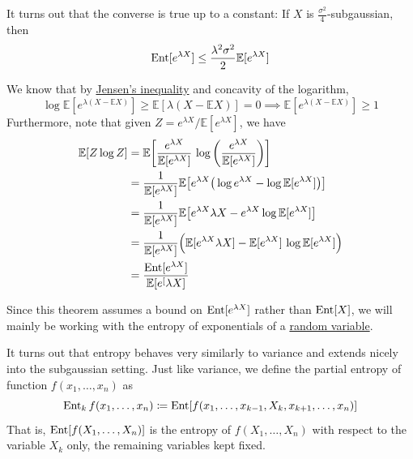   \begin{exercise}
  It turns out that the converse is true up to a constant: If $X$ is $\frac{\sigma^2}{4}$-subgaussian, then 
  \begin{equation}
    \operatorname{Ent} [e^{\lambda X}] \leq \frac{\lambda^2 \sigma^2}{2} \mathbb{E}[e^{\lambda X}]
  \end{equation}
  \end{exercise}
  \begin{solution}
  We know that by \hyperref[thm:jensens-inequality]{Jensen's inequality} and concavity of the logarithm, 
  \begin{equation}
    \log \mathbb{E}[e^{\lambda(X - \mathbb{E} X)}] \geq \mathbb{E}[\lambda (X - \mathbb{E} X)] = 0 \implies \mathbb{E}[e^{\lambda(X - \mathbb{E} X)}] \geq 1
  \end{equation}
  Furthermore, note that given $Z = e^{\lambda X} / \mathbb{E}[e^{\lambda X}]$, we have 
  \begin{align*}
      \mathbb{E}[Z \log{Z}] & = \mathbb{E} \bigg[ \frac{e^{\lambda X}}{\mathbb{E}[e^{\lambda X}]} \, \log \bigg( \frac{e^{\lambda X}}{\mathbb{E}[e^{\lambda X}]} \bigg) \bigg] \\
      & = \frac{1}{\mathbb{E}[e^{\lambda X}]} \mathbb{E}\big[ e^{\lambda X} \big( \log e^{\lambda X} - \log \mathbb{E}[e^{\lambda X}] \big) \big] \\
      & = \frac{1}{\mathbb{E}[e^{\lambda X}]} \mathbb{E} \big[ e^{\lambda X} \lambda X - e^{\lambda X} \log \mathbb{E}[e^{\lambda X}] \big] \\
      & = \frac{1}{\mathbb{E}[e^{\lambda X}]} \Big( \mathbb{E} [ e^{\lambda X} \lambda X ] - \mathbb{E}[ e^{\lambda X}] \, \log \mathbb{E}[e^{\lambda X}] \Big) \\
      & = \frac{\operatorname{Ent} [e^{\lambda X}]}{\mathbb{E}[e^[{\lambda X}]} 
  \end{align*}

  \end{solution}

  Since this theorem assumes a bound on $\operatorname{Ent}[e^{\lambda X}]$ rather than $\operatorname{Ent}[X]$, we will mainly be working with the entropy of exponentials of a \hyperref[prob-def:random-variable]{random variable}. 

  It turns out that entropy behaves very similarly to variance and extends nicely into the subgaussian setting. Just like variance, we define the partial entropy of function $f(x_1, \ldots, x_n)$ as 
  \begin{equation}
    \operatorname{Ent}_k f (x_1, \ldots, x_n) \coloneqq \operatorname{Ent}[ f(x_1, \ldots, x_{k-1}, X_k , x_{k+1}, \ldots, x_n)]
  \end{equation}
  That is, $\operatorname{Ent}[f(X_1, \ldots, X_n)]$ is the entropy of $f(X_1, \ldots, X_n)$ with respect to the variable $X_k$ only, the remaining variables kept fixed. 

